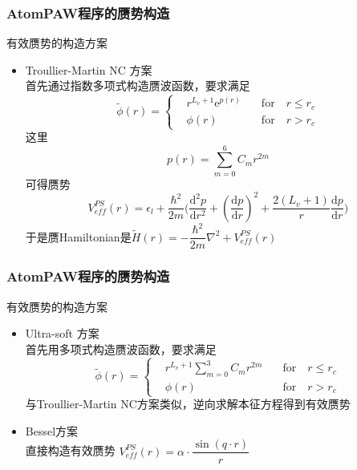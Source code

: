 \frame
{
	\frametitle{\textrm{AtomPAW}程序的赝势构造}
	有效赝势的构造方案
	\begin{itemize}
		\item \textrm{Troullier-Martin NC} 方案 \\
	首先通过指数多项式构造赝波函数，要求满足
	\begin{displaymath}
		\tilde\phi(r)=\left\{
			\begin{aligned}
				&r^{L_v+1}\mathrm{e}^{p(r)}\quad &\mathrm{for}\quad r\leqslant r_c \\
				&\phi(r)\quad &\mathrm{for}\quad r>r_c
			\end{aligned}
			\right.
	\end{displaymath}
	这里$$p(r)=\sum_{m=0}^6C_mr^{2m}$$
	可得赝势 
	$$V_{e\!f\!f}^{PS}(r)=\epsilon_l+\dfrac{\hbar^2}{2m}\bigg(\dfrac{\mathrm{d}^2p}{\mathrm{d}r^2}+(\dfrac{\mathrm{d}p}{\mathrm{d}r})^2+\dfrac{2(L_v+1)}r\dfrac{\mathrm{d}p}{\mathrm{d}r}\bigg)$$
	于是赝\textrm{Hamiltonian}是$\tilde H(r)=-\dfrac{\hbar^2}{2m}\nabla^2+V_{e\!f\!f}^{PS}(r)$
	\end{itemize}
}
\frame
{
	\frametitle{\textrm{AtomPAW}程序的赝势构造}
	有效赝势的构造方案
	\begin{itemize}
		\item \textrm{Ultra-soft} 方案 \\
	首先用多项式构造赝波函数，要求满足
	\begin{displaymath}
		\tilde\phi(r)=\left\{
			\begin{aligned}
				&r^{L_v+1}\sum_{m=0}^3C_mr^{2m}\quad &\mathrm{for}\quad r\leqslant r_c \\
				&\phi(r)\quad &\mathrm{for}\quad r>r_c
			\end{aligned}
			\right.
	\end{displaymath}
	与\textrm{Troullier-Martin NC}方案类似，逆向求解本征方程得到有效赝势
		\item \textrm{Bessel}方案\\
			直接构造有效赝势 $V_{e\!f\!f}^{PS}(r)=\alpha\cdot\dfrac{\sin(q\cdot r)}r$
	\end{itemize}
}


